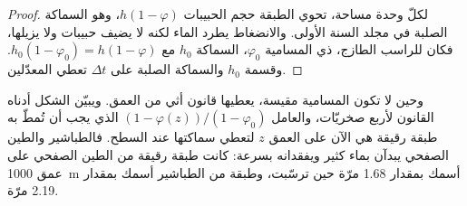 \begin{proof}
لكلّ وحدة مساحة، تحوي الطبقة حجم الحبيبات $h(1 - \varphi)$، وهو السماكة الصلبة في
مجلد السنة الأولى. والانضغاط يطرد الماء لكنه لا يضيف حبيبات ولا يزيلها، فكان للراسب
الطازج، ذي المسامية $\varphi_0$، السماكة $h_0$ مع $h_0(1 - \varphi_0) = h(1 -
\varphi)$. وقسمة $h_0$ والسماكة الصلبة على $\Delta t$ تعطي المعدّلين.
\end{proof}

وحين لا تكون المسامية مقيسة، يعطيها قانون أثي من العمق. ويبيّن الشكل أدناه
القانون لأربع صخريّات، والعامل $(1 - \varphi(z))/(1 - \varphi_0)$ الذي يجب أن تُمطّ به
طبقة رقيقة هي الآن على العمق $z$ لتعطي سماكتها عند السطح. فالطباشير والطين الصفحي
يبدآن بماء كثير ويفقدانه بسرعة: كانت طبقة رقيقة من الطين الصفحي على عمق \qty{1000}{m} أسمك
بمقدار 1.68 مرّة حين ترسّبت، وطبقة من الطباشير أسمك بمقدار 2.19 مرّة.

